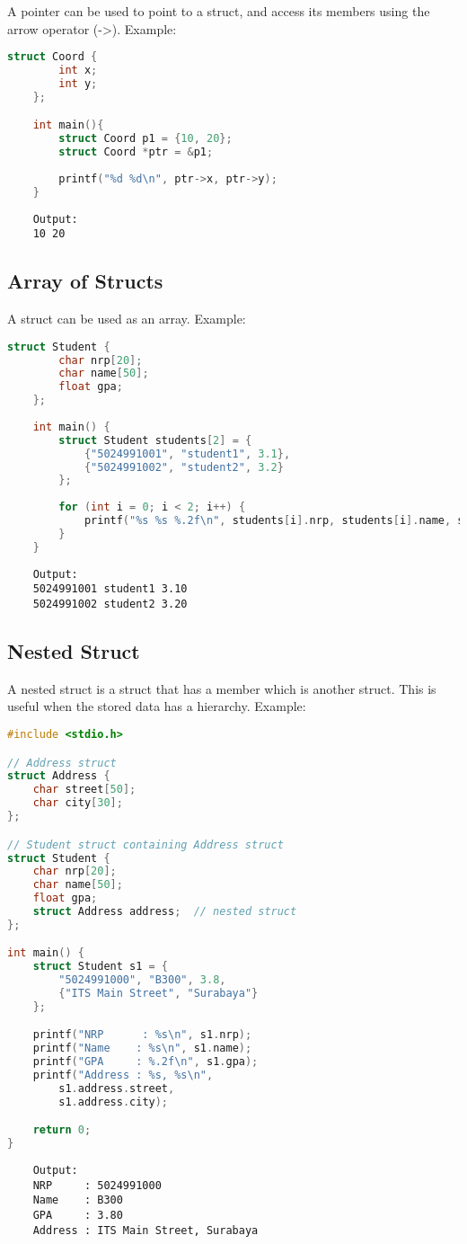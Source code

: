 A pointer can be used to point to a struct, and access its members using the arrow operator (->).
Example:
\begin{lstlisting}[language=c]
	struct Coord {
		int x;
		int y;
	};

	int main(){
		struct Coord p1 = {10, 20};
		struct Coord *ptr = &p1;
		
		printf("%d %d\n", ptr->x, ptr->y);
	}
\end{lstlisting}
\begin{verbatim}
    Output:
    10 20   
\end{verbatim}

\subsection{Array of Structs}

A struct can be used as an array.
Example:
\begin{lstlisting}[language=c]
	struct Student {
		char nrp[20];
		char name[50];
		float gpa;
	};
	
	int main() {
		struct Student students[2] = {
			{"5024991001", "student1", 3.1},
			{"5024991002", "student2", 3.2}
		};
	
		for (int i = 0; i < 2; i++) {
			printf("%s %s %.2f\n", students[i].nrp, students[i].name, students[i].gpa);
		}
	}
\end{lstlisting}
\begin{verbatim}
    Output:
    5024991001 student1 3.10
    5024991002 student2 3.20
\end{verbatim}

\subsection{Nested Struct}

A nested struct is a struct that has a member which is another struct.
This is useful when the stored data has a hierarchy.
Example:
\begin{lstlisting}[language=c]
#include <stdio.h>

// Address struct
struct Address {
	char street[50];
	char city[30];
};

// Student struct containing Address struct
struct Student {
	char nrp[20];
	char name[50];
	float gpa;
	struct Address address;  // nested struct
};

int main() {
	struct Student s1 = {
		"5024991000", "B300", 3.8,
		{"ITS Main Street", "Surabaya"}
	};

	printf("NRP      : %s\n", s1.nrp);
	printf("Name    : %s\n", s1.name);
	printf("GPA     : %.2f\n", s1.gpa);
	printf("Address : %s, %s\n",
		s1.address.street,
		s1.address.city);

	return 0;
}
\end{lstlisting}
\begin{verbatim}
    Output:
    NRP     : 5024991000
    Name    : B300
    GPA     : 3.80
    Address : ITS Main Street, Surabaya
\end{verbatim}


